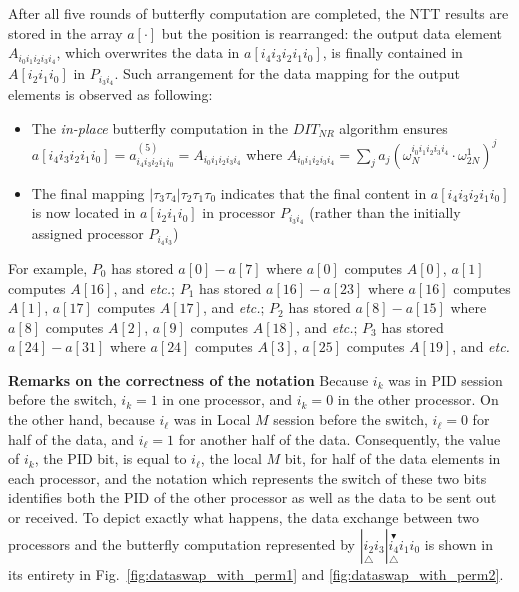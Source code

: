 \documentclass{iacrtrans}
\theoremstyle{plain}
\begin{document}
After all five rounds of butterfly computation are completed, the NTT results are stored in the array $a[\cdot]$ but the position is rearranged: the output data element $A_{i_0i_1i_2i_3i_4}$, which overwrites the data in $a[i_4i_3i_2i_1i_0]$, is finally contained in $A[i_2i_1i_0]$ in $P_{i_3i_4}$. Such arrangement for the data mapping for the output elements is observed as following:

\begin{itemize}
    \item The \textit{in-place} butterfly computation in the $DIT_{NR}$ algorithm ensures $a[i_4i_3i_2i_1i_0]=a_{i_4i_3i_2i_1i_0}^{(5)}=A_{i_0i_1i_2i_3i_4}$ where $A_{i_0i_1i_2i_3i_4}=\sum_j a_j(\omega_{N}^{i_0i_1i_2i_3i_4}\cdot\omega_{2N}^1)^j$
    \item The final mapping $|\tau_3\tau_4|\tau_2\tau_1\tau_0$ indicates that the final content in $a[i_4i_3i_2i_1i_0]$ is now located in $a[i_2i_1i_0]$ in processor $P_{i_3i_4}$ (rather than the initially assigned processor $P_{i_4i_3}$)
\end{itemize}


For example, $P_0$ has stored $a[0]-a[7]$ where $a[0]$ computes $A[0]$, $a[1]$ computes $A[16]$, and \textit{etc.}; $P_1$ has stored $a[16]-a[23]$ where $a[16]$ computes $A[1]$, $a[17]$ computes $A[17]$, and \textit{etc.}; $P_2$ has stored $a[8]-a[15]$ where $a[8]$ computes $A[2]$, $a[9]$ computes $A[18]$, and \textit{etc.}; $P_3$ has stored $a[24]-a[31]$ where $a[24]$ computes $A[3]$, $a[25]$ computes $A[19]$, and \textit{etc.}

\textbf{Remarks on the correctness of the notation} Because $i_k$ was in PID session before the switch, $i_k=1$ in one processor, and $i_k=0$ in the other processor. On the other hand, because $i_{\ell}$ was in Local $M$ session before the switch, $i_{\ell}=0$ for half of the data, and $i_{\ell}=1$ for another half of the data. Consequently, the value of $i_k$, the PID bit, is equal to $i_{\ell}$, the local $M$ bit, for half of the data elements in each processor, and the notation which represents the switch of these two bits identifies both the PID of the other processor as well as the data to be sent out or received. To depict exactly what happens, the data exchange between two processors and the butterfly computation represented by $|\underset{\triangle}{i_2}i_3|\underset{\triangle}{\overset{\blacktriangledown}{i_4}}i_1i_0$ is shown in its entirety in Fig.~\ref{fig:dataswap_with_perm1} and \ref{fig:dataswap_with_perm2}.
\end{document}
